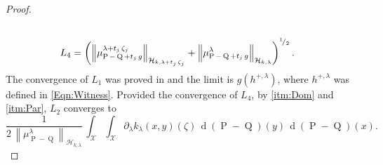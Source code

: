 \begin{proof}
\begin{equation}
\begin{aligned}
						\\
						L_{4}&=\left(\left\|\mu_{\operatorname{P}-\operatorname{Q}+t_{j}\,g}^{\lambda+t_{j}\,\zeta_{j}}\right\|_{\mathcal{H}_{k,\lambda+t_{j}\,\zeta_{j}}}+\left\|\mu_{\operatorname{P}-\operatorname{Q}+t_{j}\,g}^{\lambda}\right\|_{\mathcal{H}_{k,\lambda}}\right)^{^{1}\!/_{2}}.
					\end{aligned}
				\end{equation}
				The convergence of $L_{1}$ was proved in \textcite[Lemma 4]{Carcamo2024} and the limit is $g\left(h^{+,\lambda}\right)$, where $h^{+,\lambda}$ was defined in \eqref{Eqn:Witness}. Provided the convergence of $L_{4}$, by \ref{itm:Dom} and \ref{itm:Par}, $L_{2}$ converges to
				\begin{equation}
					\frac{1}{2\,\left\|\mu_{\operatorname{P}-\operatorname{Q}}^{\lambda}\right\|_{\mathcal{H}_{k,\lambda}}}\,\int_{\mathcal{X}}\int_{\mathcal{X}}\partial_{\lambda}k_{\lambda}(x,y)(\zeta)\,\operatorname{d}(\operatorname{P}-\operatorname{Q})(y)\,\operatorname{d}(\operatorname{P}-\operatorname{Q})(x).
				\end{equation}
				

\end{proof}
